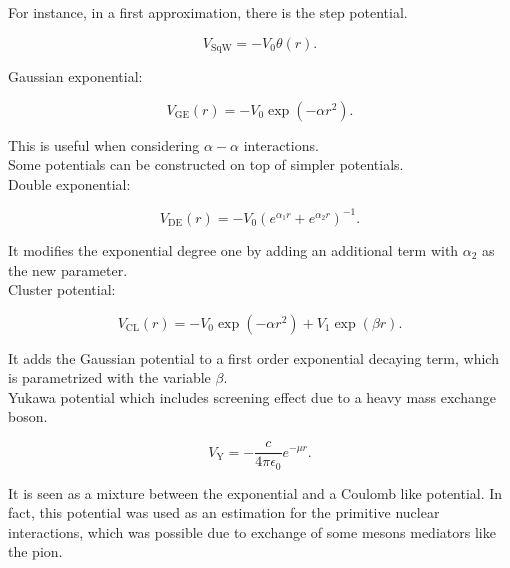 \documentclass[openany]{book}
\begin{document}
For instance, in a first approximation, there is the step potential.

\begin{equation} \label{eq:potential_squareWell}
	V_{\mathrm{SqW}} = -V_0\theta(r).
\end{equation}

Gaussian exponential: 

\begin{equation} \label{eq:potential_gaussianExponential}
	V_{\mathrm{GE}}(r) = - V_0 \exp{(-\alpha r^2 )}.
\end{equation}

This is useful when considering $\alpha-\alpha$ interactions.  \\

Some potentials can be constructed on top of simpler potentials. \\

Double exponential:

\begin{equation} \label{eq:potential_doubleExponential}
	V_{\mathrm{DE}}(r) = - V_0 \left(e^{\alpha_1 r} + e^{\alpha_2 r} \right)^{-1}.
\end{equation}

It modifies the exponential degree one by adding an additional term with $\alpha_2$ as the new parameter. \\

Cluster potential:

\begin{equation} \label{eq:potential_cluster}
	V_{\mathrm{CL}}(r) = - V_0 \exp{(-\alpha r^2 )} + V_1 \exp{(\beta r)}.
\end{equation}

It adds the Gaussian potential to a first order exponential decaying term, which is parametrized with the variable $\beta$. \\

Yukawa potential  which includes screening effect due to a heavy mass exchange boson.

\begin{equation} \label{eq:potential_Yukawa}
	V_{\mathrm{Y}} = -\frac{c}{4\pi\epsilon_0}e^{-\mu r}.
\end{equation}

It is seen as a mixture between the exponential and a Coulomb like potential. In fact, this potential was used as an estimation for the primitive nuclear interactions, which was possible due to exchange of some mesons mediators like the pion. \\
\end{document}
